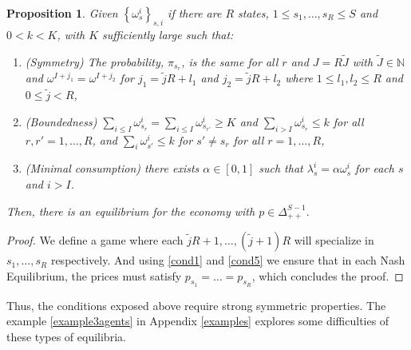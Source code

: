 \documentclass[pdftex]{article}
\numberwithin{equation}{section}
\theoremstyle{th}
\newtheorem{prop}{{Proposition}}%
\newtheorem{proof lemma}{{Proof Lemma}.}
\theoremstyle{definition}
\newtheorem*{risk lovers}{Risk lovers}
\newtheorem*{risk averse}{Risk averse}
\begin{document}
\begin{prop}
\label{propks}
Given $\left\{\omega_s^i\right\}_{s,i}$ if there are $R$ states, $1\leq{s_1},\dots,s_R\leq{S}$ and $0<k<K$, with $K$ sufficiently large such that:
\begin{enumerate}
\item (Symmetry)\label{cond1} The probability, $\pi_{s_r}$, is the same for all $r$ and $J=R\tilde{J}$ with $\tilde{J}\in\mathbb{N}$ and $\omega^{I+j_1}=\omega^{I+j_2}$ for $j_1=\tilde{j}R+l_1$ and $j_2=\tilde{j}R+l_2$ where $1\leq{l}_1,l_2\leq{R}$ and $0\leq\tilde{j}<R$,
\item (Boundedness) $\sum_{i\leq{I}}\omega_{s_r}^i=\sum_{i\leq{I}}\omega^i_{s_{r'}}\geq{K}$ and $\sum_{i>I}\omega_{s_r}^i\leq{k}$ for all $r,r'=1,\dots,R$, and $\sum_{i}\omega_{s'}^i\leq{k}$ for $s'\neq{s}_r$ for all ${r}=1,\dots,R$,
\item (Minimal consumption)\label{cond5} there exists $\alpha\in[0,1]$ such that $\lambda^i_s=\alpha\omega^i_s$ for each $s$ and $i>I$.
\end{enumerate}
Then, there is an equilibrium for the economy with $p\in\Delta_{++}^{S-1}.$
\end{prop}
\begin{proof}
We define a game where each $\tilde{j}R+1,\dots,\left(\tilde{j}+1\right)R$ will specialize in $s_1,\dots,s_R$ respectively. And using \ref{cond1} and \ref{cond5} we ensure that in each Nash Equilibrium, the prices must satisfy $p_{s_1}=\dots=p_{s_R}$, which concludes the proof.
\end{proof}

Thus, the conditions exposed above require strong symmetric properties. The example \ref{example3agents} in Appendix \ref{examples} explores some difficulties of these types of equilibria.
\end{document}
